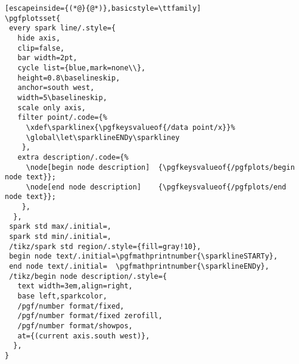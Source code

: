 \documentclass[11pt]{article}
\begin{document}
\pagestyle{empty}
\begin{lstlisting}[escapeinside={(*@}{@*)},basicstyle=\ttfamily]
\pgfplotsset{
 every spark line/.style={
   hide axis,
   clip=false,
   bar width=2pt,
   cycle list={blue,mark=none\\},
   height=0.8\baselineskip,
   anchor=south west,
   width=5\baselineskip,
   scale only axis,
   filter point/.code={%
     \xdef\sparklinex{\pgfkeysvalueof{/data point/x}}%
     \global\let\sparklineENDy\sparkliney
    },
   extra description/.code={%
     \node[begin node description]  {\pgfkeysvalueof{/pgfplots/begin node text}};
     \node[end node description]    {\pgfkeysvalueof{/pgfplots/end node text}};
    },
  },
 spark std max/.initial=,
 spark std min/.initial=,
 /tikz/spark std region/.style={fill=gray!10},
 begin node text/.initial=\pgfmathprintnumber{\sparklineSTARTy},
 end node text/.initial=  \pgfmathprintnumber{\sparklineENDy},
 /tikz/begin node description/.style={
   text width=3em,align=right,
   base left,sparkcolor,
   /pgf/number format/fixed,
   /pgf/number format/fixed zerofill,
   /pgf/number format/showpos,
   at={(current axis.south west)},
  },
}
\end{lstlisting}
\end{document}
